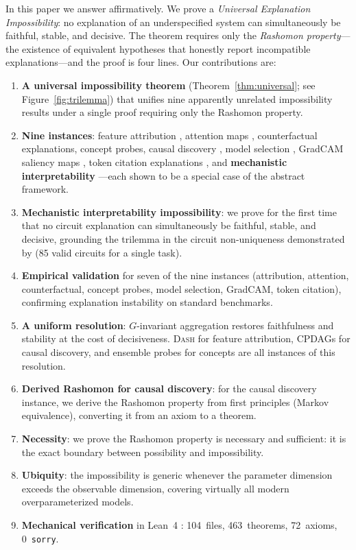 \documentclass{article}
\newcommand{\DASH}{\textsc{Dash}}
\begin{document}
In this paper we answer affirmatively.  We prove a \emph{Universal Explanation
Impossibility}: no explanation of an underspecified system can simultaneously
be faithful, stable, and decisive.  The theorem requires only the
\emph{Rashomon property}---the existence of equivalent hypotheses that
honestly report incompatible explanations---and the proof is four lines.
Our contributions are:
\begin{enumerate}
  \item \textbf{A universal impossibility theorem}
    (Theorem~\ref{thm:universal}; see Figure~\ref{fig:trilemma}) that
    unifies nine apparently unrelated impossibility results under a single
    proof requiring only the Rashomon property.
  \item \textbf{Nine instances}: feature attribution
    \citep{bilodeau2024impossibility}, attention maps
    \citep{jainwallace2019}, counterfactual explanations, concept probes,
    causal discovery \citep{verma1991equivalence}, model selection
    \citep{rudin2024amazing}, GradCAM saliency maps
    \citep{selvaraju2017gradcam}, token citation explanations
    \citep{turpin2024language}, and \textbf{mechanistic interpretability}
    \citep{meloux2025everything}---each shown to be a special case of the
    abstract framework.
  \item \textbf{Mechanistic interpretability impossibility}: we prove for the
    first time that no circuit explanation can simultaneously be faithful,
    stable, and decisive, grounding the trilemma in the circuit non-uniqueness
    demonstrated by \citet{meloux2025everything} (85 valid circuits for a
    single task).
  \item \textbf{Empirical validation} for seven of the nine instances
    (attribution, attention, counterfactual, concept probes, model selection,
    GradCAM, token citation), confirming explanation instability on
    standard benchmarks.
  \item \textbf{A uniform resolution}: $G$-invariant aggregation restores
    faithfulness and stability at the cost of decisiveness.  \DASH{} for
    feature attribution, CPDAGs for causal discovery, and ensemble probes
    for concepts are all instances of this resolution.
  \item \textbf{Derived Rashomon for causal discovery}: for the causal
    discovery instance, we derive the Rashomon property from first
    principles (Markov equivalence), converting it from an axiom to a
    theorem.
  \item \textbf{Necessity}: we prove the Rashomon property is necessary
    and sufficient: it is the exact boundary between possibility and
    impossibility.
  \item \textbf{Ubiquity}: the impossibility is generic whenever the
    parameter dimension exceeds the observable dimension, covering
    virtually all modern overparameterized models.
  \item \textbf{Mechanical verification} in Lean~4
    \citep{demoura2021lean4}: 104~files, 463~theorems, 72~axioms,
    0~\texttt{sorry}.
\end{enumerate}
\end{document}
